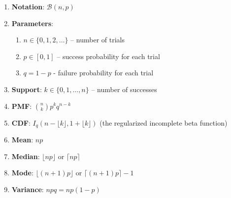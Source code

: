 \begin{enumerate}
    \item \textbf{Notation}:
    $
         {\displaystyle \mathcal{B}(n,p)}
    $
    \hfill \cite{wiki/Binomial_distribution}

    \item \textbf{Parameters}:
    \begin{enumerate}
        \item ${\displaystyle n\in \{0,1,2,\ldots \}}$ – number of trials
        \hfill \cite{wiki/Binomial_distribution}

        \item ${\displaystyle p\in [0,1]}$ – success probability for each trial
        \hfill \cite{wiki/Binomial_distribution}

        \item ${\displaystyle q=1-p}$ - failure probability for each trial
        \hfill \cite{wiki/Binomial_distribution}
    \end{enumerate}
    \hfill \cite{wiki/Binomial_distribution}

    \item \textbf{Support}:
     ${\displaystyle k\in \{0,1,\ldots ,n\}}$ – number of successes
    \hfill \cite{wiki/Binomial_distribution}

    \item \textbf{PMF}:
    $
         {\displaystyle {\binom {n}{k}}p^{k}q^{n-k}}
    $
    \hfill \cite{wiki/Binomial_distribution}

    \item \textbf{CDF}:
     ${\displaystyle I_{q}(n-\lfloor k\rfloor ,1+\lfloor k\rfloor )}$ (the regularized incomplete beta function)
    \hfill \cite{wiki/Binomial_distribution}

    \item \textbf{Mean}:
    $
         {\displaystyle np}
    $
    \hfill \cite{wiki/Binomial_distribution}

    \item \textbf{Median}:
    ${\displaystyle \lfloor np\rfloor }$ or ${\displaystyle \lceil np\rceil }$
    \hfill \cite{wiki/Binomial_distribution}

    \item \textbf{Mode}:
     ${\displaystyle \lfloor (n+1)p\rfloor }$ or ${\displaystyle \lceil (n+1)p\rceil -1}$
    \hfill \cite{wiki/Binomial_distribution}

    \item \textbf{Variance}:
    $
         {\displaystyle npq=np(1-p)}
    $
    \hfill \cite{wiki/Binomial_distribution}


\end{enumerate}
